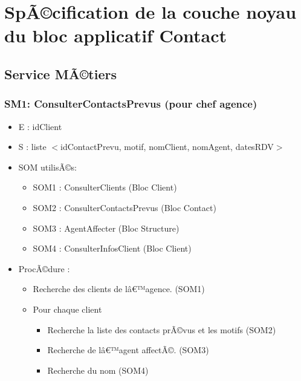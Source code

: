 \section{SpÃ©cification de la couche noyau du bloc applicatif Contact}

\subsection{Service MÃ©tiers}
\subsubsection{SM1: ConsulterContactsPrevus (pour chef agence)}
\begin{itemize}
\item E : idClient
\item S : liste $<$idContactPrevu, motif, nomClient, nomAgent, datesRDV$>$
\item SOM utilisÃ©s: 	
\begin{itemize}		
\item SOM1 : ConsulterClients (Bloc Client)
\item SOM2 : ConsulterContactsPrevus (Bloc Contact)
\item SOM3 : AgentAffecter (Bloc Structure)
\item SOM4 : ConsulterInfosClient (Bloc Client)	
\end{itemize}		
\item ProcÃ©dure : 	
\begin{itemize}		
\item Recherche des clients de lâ€™agence. (SOM1)
\item Pour chaque client
\begin{itemize}
\item Recherche la liste des contacts prÃ©vus et les motifs (SOM2)
\item Recherche de lâ€™agent affectÃ©. (SOM3)
\item Recherche du nom (SOM4)
\end{itemize}
\end{itemize}
\end{itemize}
